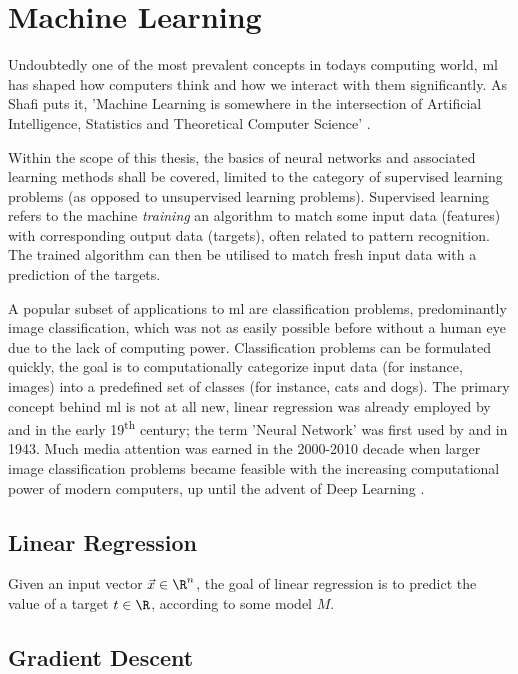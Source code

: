 \pagebreak
\section{Machine Learning}
Undoubtedly one of the most prevalent concepts in todays computing world, \gls{ml} has shaped how computers think and how we interact with them significantly.
As Shafi  puts it, 'Machine Learning is somewhere in the intersection of Artificial Intelligence, Statistics and Theoretical Computer Science' \parencite{goldwasserTalk2018}.

Within the scope of this thesis, the basics of neural networks and associated learning methods shall be covered, limited to the category of supervised learning problems (as opposed to unsupervised learning problems).
Supervised learning refers to the machine \textit{training} an algorithm to match some input data (features) with corresponding output data (targets), often related to pattern recognition.
The trained algorithm can then be utilised to match fresh input data with a prediction of the targets.

A popular subset of applications to \gls{ml} are classification problems, predominantly image classification, which was not as easily possible before without a human eye due to the lack of computing power.
Classification problems can be formulated quickly, the goal is to computationally categorize input data (for instance, images) into a predefined set of classes (for instance, cats and dogs).
The primary concept behind \acrlong{ml} is not at all new, linear regression was already employed by  and  in the early 19\textsuperscript{th} century; the term 'Neural Network' was first used by  and  in 1943.
Much media attention was earned in the 2000-2010 decade when larger image classification problems became feasible with the increasing computational power of modern computers, up until the advent of Deep Learning \parencite{bishop-pattern-recognition-and-ml}.

\subsection{Linear Regression}
Given an input vector $\vec{x} \in \R^n$, the goal of linear regression is to predict the value of a target $t \in \R$, according to some model $M$.

\subsection{Gradient Descent}
